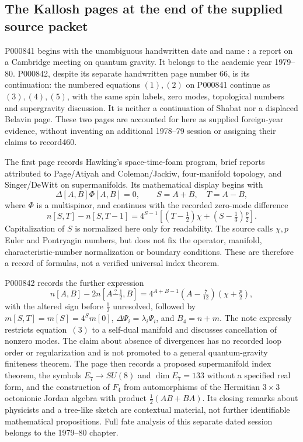 \subsection{The Kallosh pages at the end of the supplied source packet}
P000841 begins with the unambiguous handwritten date  and name : a report on a Cambridge meeting on quantum gravity. It belongs to the academic year 1979--80. P000842, despite its separate handwritten page number \(66\), is its continuation: the numbered equations \((1),(2)\) on P000841 continue as \((3),(4),(5)\), with the same spin labels, zero modes, topological numbers and supergravity discussion. It is neither a continuation of Shabat nor a displaced Belavin page. These two pages are accounted for here as supplied foreign-year evidence, without inventing an additional 1978--79 session or assigning their claims to record460.

The first page records Hawking's space-time-foam program, brief reports attributed to Page/Atiyah and Coleman/Jackiw, four-manifold topology, and Singer/DeWitt on supermanifolds. Its mathematical display begins with
\[
 \Delta[A,B]\Phi[A,B]=0,\qquad S=A+B,\quad T=A-B,
\]
where \(\Phi\) is a multispinor, and continues with the recorded zero-mode difference
\[
 n[S,T]-n[S,T-1]
 =4^{S-1}\left[\left(T-\tfrac12\right)\chi
              +\left(S-\tfrac13\right)\tfrac p2\right].
\]
Capitalization of \(S\) is normalized here only for readability. The source calls \(\chi,p\) Euler and Pontryagin numbers, but does not fix the operator, manifold, characteristic-number normalization or boundary conditions. These are therefore a record of formulas, not a verified universal index theorem.

P000842 records the further expression
\[
 n[A,B]-2n[A\mathbin{\overset{?}{-}}\tfrac12,B]
 =4^{A+B-1}\left(A-\tfrac7{12}\right)
       \left(\chi+\tfrac p2\right),
\]
with the altered sign before \(\tfrac12\) unresolved, followed by
\(m[S,T]=m[S]=4^S m[0]\), \(\Delta\Psi_i=\lambda_i\Psi_i\), and \(B_4=n+m\). The note expressly restricts equation~\((3)\) to a self-dual manifold and discusses cancellation of nonzero modes. The claim about absence of divergences has no recorded loop order or regularization and is not promoted to a general quantum-gravity finiteness theorem. The page then records a proposed supermanifold index theorem, the symbols \(E_7\to SU(8)\) and \(\dim E_7=133\) without a specified real form, and the construction of \(F_4\) from automorphisms of the Hermitian \(3\times3\) octonionic Jordan algebra with product \(\tfrac12(AB+BA)\). Its closing remarks about physicists and a tree-like sketch are contextual material, not further identifiable mathematical propositions. Full fate analysis of this separate dated session belongs to the 1979--80 chapter.
